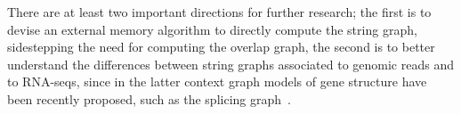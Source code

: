 \documentclass[runningheads,envcountsame,a4paper]{llncs}
\begin{document}
There are at least two important directions for further research; the first is
to devise an external memory algorithm to directly compute the string graph,
sidestepping the need for computing the overlap graph, the second is to
better understand the differences between string graphs associated to genomic
reads and to RNA-seqs, since in the latter context graph models of gene structure
have been recently proposed, such as the splicing graph~\cite{Beretta2013}.



\end{document}
